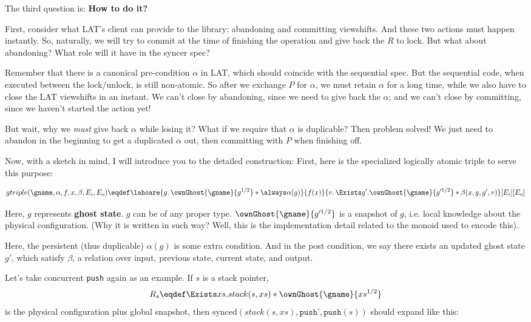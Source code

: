 \documentclass[11pt]{article}
\begin{document}
The third question is: \textbf{How to do it?}

First, consider what LAT's client can provide to the library: abandoning and committing viewshifts. And these two actions must happen instantly. So, naturally, we will try to commit at the time of finishing the operation and give back the $R$ to lock. But what about abandoning? What role will it have in the syncer spec?

Remember that there is a canonical pre-condition $\alpha$ in LAT, which should coincide with the sequential spec. But the sequential code, when executed between the lock/unlock, is still non-atomic. So after we exchange $P$ for $\alpha$, we must retain $\alpha$ for a long time, while we also have to close the LAT viewshifts in an instant. We can't close by abandoning, since we need to give back the $\alpha$; and we can't close by committing, since we haven't started the action yet!

But wait, why we \emph{must} give back $\alpha$ while losing it? What if we require that $\alpha$ is duplicable? Then problem solved! We just need to abandon in the beginning to get a duplicated $\alpha$ out, then committing with $P$ when finishing off.

Now, with a sketch in mind, I will introduce you to the detailed construction: First, here is the specialized logically atomic triple to serve this purpose:

\[ gtriple(\gname, \alpha, f, x, \beta, E_i, E_o) \eqdef
   \lahoare{g.\, \ownGhost{\gname}{g^{1/2}} * \always \alpha(g)}
           {f(x)}
           {v.\, \Exists g'. \ownGhost{\gname}{g'^{1/2}} * \beta(x, g, g', v)}[E_i][E_o]\]

Here, $g$ represents \textbf{ghost state}. $g$ can be of any proper type. $\ownGhost{\gname}{g'^{1/2}}$ is a snapshot of $g$, i.e. local knowledge about the physical configuration. (Why it is written in such way? Well, this is the implementation detail related to the monoid used to encode this).

Here, the persistent (thus duplicable) $\alpha(g)$ is some extra condition. And in the post condition, we say there exists an updated ghost state $g'$, which satisfy $\beta$, a relation over input, previous state, current state, and output.

Let's take concurrent \texttt{push} again as an example. If $s$ is a stack pointer, \[R_s \eqdef \Exists xs. stack(s, xs) * \ownGhost{\gname}{xs^{1/2}}\] is the physical configuration plus global snapshot, then $\text{synced}(stack(s, xs), \texttt{push'}, \texttt{push}(s))$ should expand like this:
\end{document}
